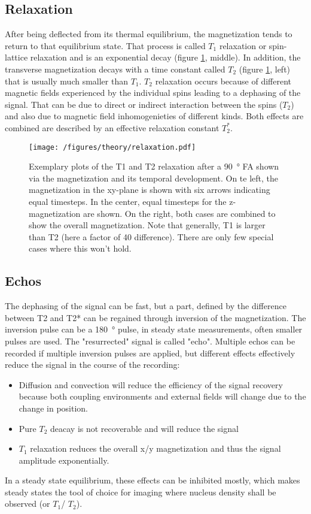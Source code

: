         \subsection{Relaxation}
        \label{chapter:theory:relaxation}
        After being deflected from its thermal equilibrium, the magnetization tends to return to that equilibrium state. That process is called $T_1$ relaxation or spin-lattice relaxation and is an exponential decay (figure \ref{theory:figure:relaxation}, middle). In addition, the transverse magnetization decays with a time constant called $T_2$ (figure \ref{theory:figure:relaxation}, left) that is usually much smaller than $T_1$. $T_2$ relaxation occurs because of different magnetic fields experienced by the individual spins leading to a dephasing of the signal. That can be due to direct or indirect interaction between the spins ($T_2$) and also due to magnetic field inhomogenieties of different kinds. Both effects are combined are described by an effective relaxation constant $T_2^*$.
            \begin{figure}
                \texttt{[image: /figures/theory/relaxation.pdf]}
                \caption[Relaxation in NMR]{Exemplary plots of the T1 and T2 relaxation after a \SI{90}{\degree} FA shown via the magnetization and its temporal development. On te left, the magnetization in the xy-plane is shown with six arrows indicating equal timesteps. In the center, equal timesteps for the z-magnetization are shown. On the right, both cases are combined to show the overall magnetization. Note that generally, T1 is larger than T2 (here a factor of 40 difference). There are only few special cases where this won't hold.}
                \label{theory:figure:relaxation}
            \end{figure}
        \subsection{Echos}
        The dephasing of the signal can be fast, but a part, defined by the difference between T2 and T2* can be regained through inversion of the magnetization. The inversion pulse can be a \SI{180}{\degree} pulse, in steady state measurements, often smaller pulses are used. The "resurrected" signal is called "echo". Multiple echos can be recorded if multiple inversion pulses are applied, but different effects effectively reduce the signal in the course of the recording:
        \begin{itemize}
            \item Diffusion and convection will reduce the efficiency of the signal recovery because both coupling environments and external fields will change due to the change in position.
            \item Pure $T_2$ deacay is not recoverable and will reduce the signal
            \item $T_1$ relaxation reduces the overall x/y magnetization and thus the signal amplitude exponentially.
        \end{itemize}
        In a steady state equilibrium, these effects can be inhibited mostly, which makes steady states the tool of choice for imaging where nucleus density shall be observed (or $T_1$/ $T_2$).
